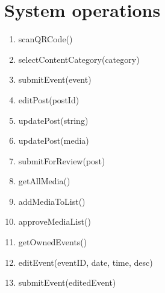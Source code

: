 \documentclass{article}
\begin{document}
\section{System operations}
\begin{enumerate}
    \item scanQRCode()
    \item selectContentCategory(category)
    \item submitEvent(event)
    \item editPost(postId)
    \item updatePost(string)
    \item updatePost(media)
    \item submitForReview(post)
    \item getAllMedia()
    \item addMediaToList()
    \item approveMediaList()
    \item getOwnedEvents()
    \item editEvent(eventID, date, time, desc)
    \item submitEvent(editedEvent)
\end{enumerate}
\end{document}
